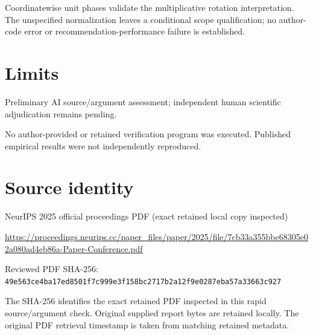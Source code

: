 \documentclass[11pt]{article}
\begin{document}
Coordinatewise unit phases validate the multiplicative rotation interpretation. The unspecified normalization leaves a conditional scope qualification; no author-code error or recommendation-performance failure is established.

\section*{Limits}

Preliminary AI source/argument assessment; independent human scientific adjudication remains pending.\par

No author-provided or retained verification program was executed. Published empirical results were not independently reproduced.\par

\section*{Source identity}

NeurIPS 2025 official proceedings PDF (exact retained local copy inspected)

\url{https://proceedings.neurips.cc/paper_files/paper/2025/file/7cb33a355bbe68305e02a080ad4eb86a-Paper-Conference.pdf}

Reviewed PDF SHA-256: \nolinkurl{49e563ce4ba17ed8501f7c999e3f158bc2717b2a12f9e0287eba57a33663c927}

The SHA-256 identifies the exact retained PDF inspected in this rapid source/argument check. Original supplied report bytes are retained locally. The original PDF retrieval timestamp is taken from matching retained metadata.
\end{document}
